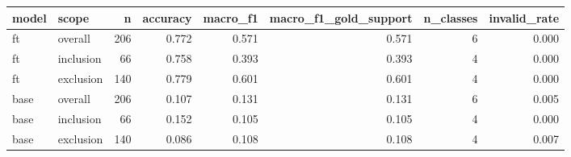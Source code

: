 \begin{tabular}{llrrrrrr}
\toprule
model & scope & n & accuracy & macro\_f1 & macro\_f1\_gold\_support & n\_classes & invalid\_rate \\
\midrule
ft & overall & 206 & 0.772 & 0.571 & 0.571 & 6 & 0.000 \\
ft & inclusion & 66 & 0.758 & 0.393 & 0.393 & 4 & 0.000 \\
ft & exclusion & 140 & 0.779 & 0.601 & 0.601 & 4 & 0.000 \\
base & overall & 206 & 0.107 & 0.131 & 0.131 & 6 & 0.005 \\
base & inclusion & 66 & 0.152 & 0.105 & 0.105 & 4 & 0.000 \\
base & exclusion & 140 & 0.086 & 0.108 & 0.108 & 4 & 0.007 \\
\bottomrule
\end{tabular}
